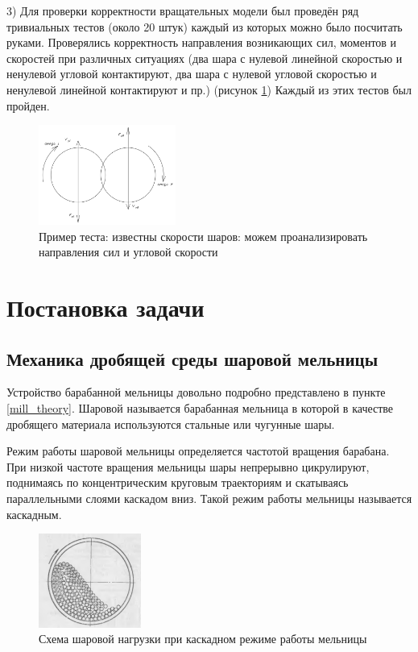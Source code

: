 \documentclass[a4paper]{article}
\begin{document}
3) Для проверки корректности вращательных модели был проведён ряд тривиальных тестов (около 20 штук) каждый из которых можно было посчитать руками. 
Проверялись корректность направления возникающих сил, моментов и скоростей при различных ситуациях (два шара с нулевой линейной скоростью и ненулевой угловой контактируют, два шара с нулевой угловой скоростью и ненулевой линейной контактируют и пр.) (рисунок \ref{pic:test_primer})
Каждый из этих тестов был пройден.

\begin{figure}[h!]
	\centering
	\includegraphics[width=0.4\textwidth]{test_primer} 
	\caption{Пример теста: известны скорости шаров: можем проанализировать направления сил и угловой скорости}
	\label{pic:test_primer}
\end{figure} 

\newpage

\section{Постановка задачи}

\subsection{Механика дробящей среды шаровой мельницы}

Устройство барабанной мельницы довольно подробно представлено в пункте \ref{mill_theory}.
Шаровой называется барабанная мельница в которой в качестве дробящего материала используются стальные или чугунные шары.

Режим работы шаровой мельницы определяется частотой вращения барабана.
При низкой частоте вращения мельницы шары непрерывно цикрулируют, поднимаясь по концентрическим круговым траекториям и скатываясь параллельными слоями каскадом вниз.
Такой режим работы мельницы называется каскадным.

\begin{figure}[H]
	\centering
	\includegraphics[width=0.3\textwidth]{kaskad_theory} 
	\caption{Схема шаровой нагрузки при каскадном режиме работы мельницы}
	\label{pic:kaskad_theory}
\end{figure} 
\end{document}
